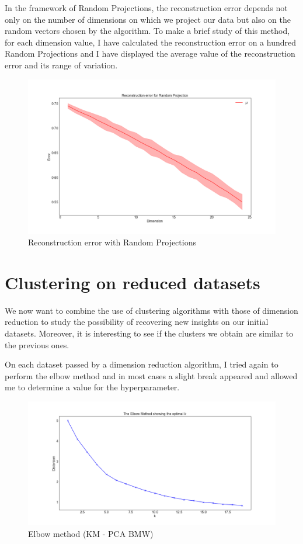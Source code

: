 \documentclass[15pt]{article}
\begin{document}
\begin{multicols}{2}
In the framework of Random Projections, the reconstruction error depends not only on the number of dimensions on which we project our data but also on the random vectors chosen by the algorithm. To make a brief study of this method, for each dimension value, I have calculated the reconstruction error on a hundred Random Projections and I have displayed the average value of the reconstruction error and its range of variation.

\begin{figure}[H]
\centering
\includegraphics[width = \columnwidth]{HerrrecRandom.png}
\caption{Reconstruction error with Random Projections}
\end{figure}

\section{Clustering on reduced datasets}

We now want to combine the use of clustering algorithms with those of dimension reduction to study the possibility of recovering new insights on our initial datasets. Moreover, it is interesting to see if the clusters we obtain are similar to the previous ones.

On each dataset passed by a dimension reduction algorithm, I tried again to perform the elbow method and in most cases a slight break appeared and allowed me to determine a value for the hyperparameter.

\begin{figure}[H]
\centering
\includegraphics[width = \columnwidth]{elbowkmpca.png}
\caption{Elbow method (KM - PCA BMW)}
\end{figure}


\end{multicols}
\end{document}
